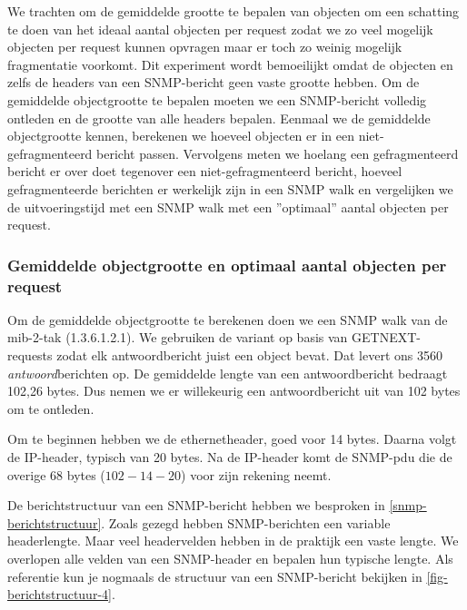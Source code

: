 We trachten om de gemiddelde grootte te bepalen van objecten om een schatting te doen van het ideaal aantal objecten per request
zodat we zo veel mogelijk objecten per request kunnen opvragen maar er toch zo weinig mogelijk fragmentatie voorkomt.
Dit experiment wordt bemoeilijkt omdat de objecten en zelfs de headers van een SNMP-bericht geen vaste grootte hebben.
Om de gemiddelde objectgrootte te bepalen moeten we een SNMP-bericht volledig ontleden en de grootte van alle headers bepalen.
Eenmaal we de gemiddelde objectgrootte kennen, berekenen we hoeveel objecten er in een niet-gefragmenteerd bericht passen.
Vervolgens meten we hoelang een gefragmenteerd bericht er over doet tegenover een niet-gefragmenteerd bericht,
hoeveel gefragmenteerde berichten er werkelijk zijn in een SNMP walk en vergelijken we de uitvoeringstijd met
een SNMP walk met een ''optimaal'' aantal objecten per request.


\subsubsection{Gemiddelde objectgrootte en optimaal aantal objecten per request}

Om de gemiddelde objectgrootte te berekenen doen we een SNMP walk van de mib-2-tak (1.3.6.1.2.1).
We gebruiken de variant op basis van GETNEXT-requests zodat elk antwoordbericht juist een object bevat.
Dat levert ons 3560 \emph{antwoord}berichten op.
De gemiddelde lengte van een antwoordbericht bedraagt 102,26 bytes.
Dus nemen we er willekeurig een antwoordbericht uit van 102 bytes om te ontleden.

Om te beginnen hebben we de ethernetheader, goed voor 14 bytes\cite{ethernet-header}.
Daarna volgt de IP-header, typisch van 20 bytes\cite{ipv4-header-wiki}.
Na de IP-header komt de SNMP-\gls{pdu} die de overige 68 bytes ($ 102 - 14 - 20$) voor zijn rekening neemt.

De berichtstructuur van een SNMP-bericht hebben we besproken in \cref{snmp-berichtstructuur}.
Zoals gezegd hebben SNMP-berichten een variable headerlengte.
Maar veel headervelden hebben in de praktijk een vaste lengte.
We overlopen alle velden van een SNMP-header en bepalen hun typische lengte.
Als referentie kun je nogmaals de structuur van een SNMP-bericht bekijken in \cref{fig-berichtstructuur-4}.

